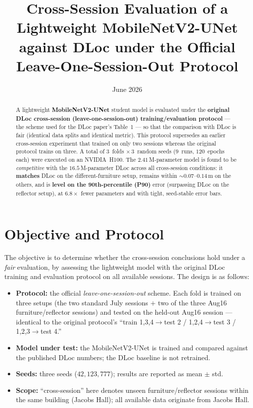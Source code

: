 \documentclass[11pt,a4paper]{article}
\title{\vspace{-1.5em}Cross-Session Evaluation of a Lightweight MobileNetV2-UNet
against DLoc under the Official Leave-One-Session-Out Protocol}
\author{}
\date{June 2026}
\begin{document}
\maketitle

\begin{abstract}
\noindent A lightweight \textbf{MobileNetV2-UNet} student model is evaluated under the
\textbf{original DLoc cross-session (leave-one-session-out) training/evaluation protocol} --- the
scheme used for the DLoc paper's Table~1 --- so that the comparison with DLoc is fair (identical
data splits and identical metric). This protocol supersedes an earlier cross-session experiment
that trained on only two sessions whereas the original protocol trains on three. A total of
$3$~folds $\times\,3$~random seeds ($9$~runs, $120$~epochs each) were executed on an NVIDIA~H100.
The $2.41$\,M-parameter model is found to be \emph{competitive} with the $16.5$\,M-parameter DLoc
across all cross-session conditions: it \textbf{matches} DLoc on the different-furniture setup,
remains within ${\sim}0.07$--$0.14$\,m on the others, and is \textbf{level on the 90th-percentile
(P90)} error (surpassing DLoc on the reflector setup), at $\mathbf{6.8\times}$ fewer parameters
and with tight, seed-stable error bars.
\end{abstract}

\section{Objective and Protocol}

The objective is to determine whether the cross-session conclusions hold under a \emph{fair}
evaluation, by assessing the lightweight model with the original DLoc training and evaluation
protocol on all available sessions. The design is as follows:

\begin{itemize}[nosep]
  \item \textbf{Protocol:} the official \emph{leave-one-session-out} scheme. Each fold is trained
  on three setups (the two standard July sessions $+$ two of the three Aug16 furniture/reflector
  sessions) and tested on the held-out Aug16 session --- identical to the original protocol's
  ``train 1,3,4$\rightarrow$test 2 / 1,2,4$\rightarrow$test 3 / 1,2,3$\rightarrow$test 4.''
  \item \textbf{Model under test:} the MobileNetV2-UNet is trained and compared against the
  published DLoc numbers; the DLoc baseline is not retrained.
  \item \textbf{Seeds:} three seeds ($42, 123, 777$); results are reported as mean $\pm$ std.
  \item \textbf{Scope:} ``cross-session'' here denotes unseen furniture/reflector sessions within
  the same building (Jacobs Hall); all available data originate from Jacobs Hall.
\end{itemize}
\end{document}
